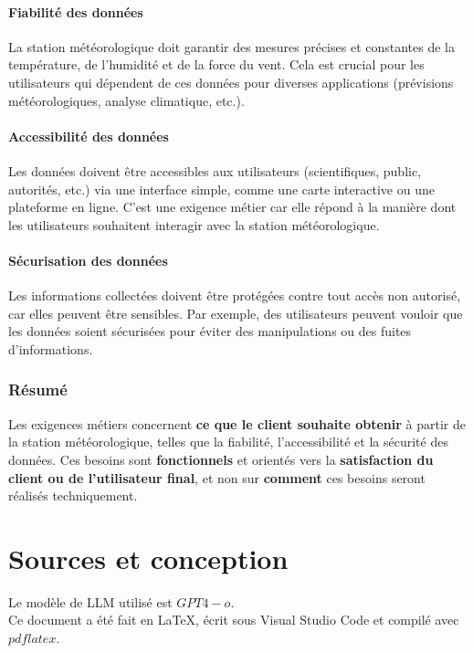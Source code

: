 \documentclass[titlepage]{article}
\begin{document}
	\paragraph{Fiabilité des données}
	La station météorologique doit garantir des mesures précises et constantes de la température, de l'humidité et de la force du vent. Cela est crucial pour les utilisateurs qui dépendent de ces données pour diverses applications (prévisions météorologiques, analyse climatique, etc.).

	\paragraph{Accessibilité des données}
	Les données doivent être accessibles aux utilisateurs (scientifiques, public, autorités, etc.) via une interface simple, comme une carte interactive ou une plateforme en ligne. C'est une exigence métier car elle répond à la manière dont les utilisateurs souhaitent interagir avec la station météorologique.

	\paragraph{Sécurisation des données}
	Les informations collectées doivent être protégées contre tout accès non autorisé, car elles peuvent être sensibles. Par exemple, des utilisateurs peuvent vouloir que les données soient sécurisées pour éviter des manipulations ou des fuites d'informations.

	\subsubsection{Résumé}
	Les exigences métiers concernent \textbf{ce que le client souhaite obtenir} à partir de la station météorologique, telles que la fiabilité, l'accessibilité et la sécurité des données. Ces besoins sont \textbf{fonctionnels} et orientés vers la \textbf{satisfaction du client ou de l'utilisateur final}, et non sur \textbf{comment} ces besoins seront réalisés techniquement.

	\clearpage

	\section{Sources et conception}

	Le modèle de LLM utilisé est $GPT4-o$. \\

	Ce document a été fait en LaTeX, écrit sous Visual Studio Code et compilé avec $pdflatex$.
\end{document}
